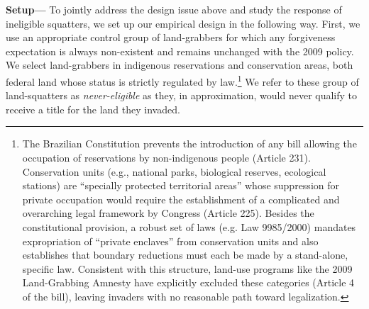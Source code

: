 \documentclass[12pt]{article}
\begin{document}
\textbf{Setup---} To jointly address the design issue above and study the response of ineligible squatters, we set up our empirical design in the following way. First, we use an appropriate control group of land-grabbers for which any forgiveness expectation is always non-existent and remains unchanged with the 2009 policy. We select land-grabbers in indigenous reservations and conservation areas, both federal land whose status is strictly regulated by law.\footnote{The Brazilian Constitution prevents the introduction of any bill allowing the occupation of reservations by non-indigenous people (Article 231). Conservation units (e.g., national parks, biological reserves, ecological stations) are ``specially protected territorial areas'' whose suppression for private occupation would require the establishment of a complicated and overarching legal framework by Congress (Article 225). Besides the constitutional provision, a robust set of laws (e.g. Law 9985/2000) mandates expropriation of ``private enclaves'' from conservation units and also establishes that boundary reductions must each be made by a stand-alone, specific law. Consistent with this structure, land-use programs like the 2009 Land-Grabbing Amnesty have explicitly excluded these categories (Article 4 of the bill), leaving invaders with no reasonable path toward legalization.} We refer to these group of land-squatters as \textit{never-eligible} as they, in approximation, would never qualify to receive a title for the land they invaded. 
\ 
\end{document}
